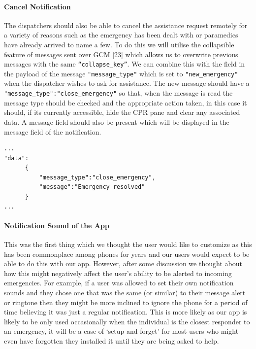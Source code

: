 \documentclass{article}
\begin{document}
	\paragraph{Cancel Notification}
	The dispatchers should also be able to cancel the assistance request remotely for a variety of reasons such as the emergency has been dealt with or paramedics have already arrived to name a few. To do this we will utilise the collapsible feature of messages sent over GCM [23] which allows us to overwrite previous messages with the same \texttt{\color{OliveGreen}“collapse\_key”}. We can combine this with the field in the payload of the message \texttt{\color{OliveGreen}"message\_type"} which is set to \texttt{\color{OliveGreen}"new\_emergency"} when the dispatcher wishes to ask for assistance. The new message should have a  \texttt{\color{OliveGreen}"message\_type":"close\_emergency"} so that, when the message is read the message type should be checked and the appropriate action taken, in this case it should, if its currently accessible, hide the CPR pane and clear any associated data. A message field should also be present which will be displayed in the message field of the notification.
	\begin{lstlisting}
...
"data":
      {
          "message_type":"close_emergency",
          "message":"Emergency resolved"
      }
...
	\end{lstlisting}
	
	\paragraph{Notification Sound of the App}
	This was the first thing which we thought the user would like to customize as this has been  commonplace among phones for years and our users would expect to be able to do this with our app. However, after some discussion we thought about how this might negatively affect the user’s ability to be alerted to incoming emergencies. For example, if a user was allowed to set their own notification sounds and they chose one that was the same (or similar) to their message alert or ringtone then they might be more inclined to ignore the phone for a period of time believing it was just a regular notification. This is more likely as our app is likely to be only used occasionally when the individual is the closest responder to an emergency, it will be a case of ‘setup and forget’ for most users who might even have forgotten they installed it until they are being asked to help.\\
\end{document}
